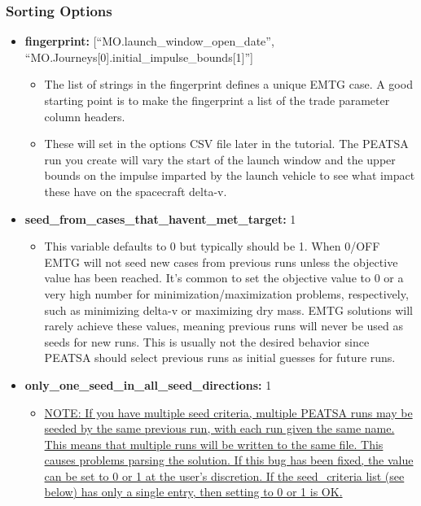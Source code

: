 \documentclass[11pt]{article}
\makeatletter
\newcommand{\knownissuelabel}[2]
{
	 \phantomsection
  	\hyperref[#2_h]{#1}\def\@currentlabel{\unexpanded{#1}}\label{#2_b}
}
\makeatother
\begin{document}
\subsubsection{Sorting Options}
\label{sec:sorting_options}

\begin{itemize}
	\item\textbf{fingerprint:} [``MO.launch\_window\_open\_date'', ``MO.Journeys[0].initial\_impulse\_bounds[1]'']
	\begin{itemize}
		\item The list of strings in the fingerprint defines a unique \ac{EMTG} case. A good starting point is to make the fingerprint a list of the trade parameter column headers.
		\item These will set in the options CSV file later in the tutorial. The \ac{PEATSA} run you create will vary the start of the launch window and the upper bounds on the impulse imparted by the launch vehicle to see what impact these have on the spacecraft delta-v.
	\end{itemize}
	\item\textbf{seed\_from\_cases\_that\_havent\_met\_target:} 1
	\begin{itemize}
		\item This variable defaults to 0 but typically should be 1. When 0/OFF \ac{EMTG} will not seed new cases from previous runs unless the objective value has been reached. It’s common to set the objective value to 0 or a very high number for minimization/maximization problems, respectively, such as minimizing delta-v or maximizing dry mass. \ac{EMTG} solutions will rarely achieve these values, meaning previous runs will never be used as seeds for new runs. This is usually not the desired behavior since \ac{PEATSA} should select previous runs as initial guesses for future runs.
	\end{itemize}
	\item\textbf{only\_one\_seed\_in\_all\_seed\_directions:} 1
	\begin{itemize}
		\item\knownissuelabel{NOTE: If you have multiple seed criteria, multiple \ac{PEATSA} runs may be seeded by the same previous run, with each run given the same name. This means that multiple runs will be written to the same file. This causes problems parsing the solution. If this bug has been fixed, the value can be set to 0 or 1 at the user’s discretion. If the seed\_criteria list (see below) has only a single entry, then setting to 0 or 1 is OK.}{runs_write_to_same_file_issue}

\end{itemize}
\end{itemize}
\end{document}
